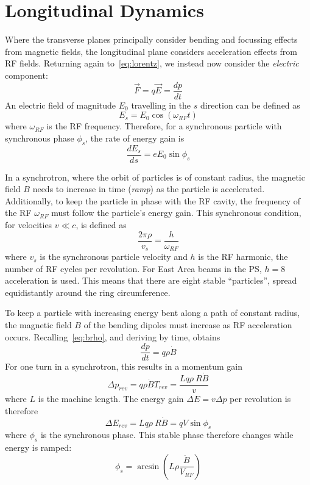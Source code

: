 \documentclass[a4paper,twoside,11pt]{report}
\begin{document}
\section{Longitudinal Dynamics}\label{sec:long}

Where the transverse planes principally consider bending and focussing effects from magnetic fields, the longitudinal plane considers acceleration effects from RF fields. Returning again to~\autoref{eq:lorentz}, we instead now consider the \textit{electric} component:
\begin{equation}
  \vec F = q\vec E = \frac{dp}{dt}
\end{equation} 
An electric field of magnitude $E_0$ travelling in the $s$ direction can be defined as
\begin{equation}
  E_s = E_0\cos(\omega_{RF}t)
\end{equation} where $\omega_{RF}$ is the RF frequency. Therefore, for a synchronous particle with synchronous phase $\phi_s$, the rate of energy gain is
\begin{equation}
  \frac{dE_s}{ds}=eE_0\sin\phi_s
\end{equation}

In a synchrotron, where the orbit of particles is of constant radius, the magnetic field $B$ needs to increase in time (\textit{ramp}) as the particle is accelerated. Additionally, to keep the particle in phase with the RF cavity, the frequency of the RF $\omega_{RF}$ must follow the particle's energy gain. This synchronous condition, for velocities $v\ll c$, is defined as
\begin{equation}
  \frac{2\pi\rho}{v_s}=\frac h{\omega_{RF}}
\end{equation} where $v_s$ is the synchronous particle velocity and $h$ is the RF harmonic, the number of RF cycles per revolution. For East Area beams in the PS, $h=8$ acceleration is used. This means that there are eight stable ``particles'', spread equidistantly around the ring circumference. 

To keep a particle with increasing energy bent along a path of constant radius, the magnetic field $B$ of the bending dipoles must increase as RF acceleration occurs. Recalling~\autoref{eq:brho}, and deriving by time, obtains
\begin{equation}
  \frac{dp}{dt} = q\rho\dot B
\end{equation}
For one turn in a synchrotron, this results in a momentum gain
\begin{equation}
  \Delta p_{rev} = q\rho\dot B T_{rev}=\frac{Lq\rho~R\dot B}v
\end{equation} where $L$ is the machine length. 
The energy gain $\Delta E=v\Delta p$ per revolution is therefore
\begin{equation}
  \Delta E_{rev} = Lq\rho~R\dot B=qV\sin \phi_s
  \label{eq:ef_sin}
\end{equation} where $\phi_s$ is the synchronous phase. This stable phase therefore changes while energy is ramped:
\begin{equation}
  \phi_s=\arcsin\left(L\rho\frac{\dot B}{V_{RF}}\right)
  \label{eq:sync_phase}
\end{equation}
\end{document}

